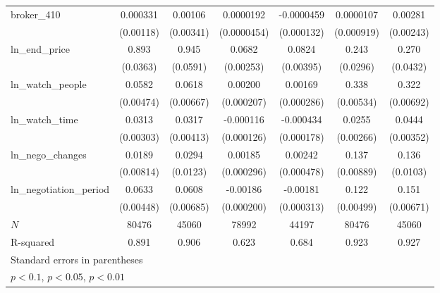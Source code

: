 {\begin{tabular}{l*{6}{c}}
broker\_410  &    0.000331         &     0.00106         &   0.0000192         &  -0.0000459         &   0.0000107         &     0.00281         \\
            &   (0.00118)         &   (0.00341)         & (0.0000454)         &  (0.000132)         &  (0.000919)         &   (0.00243)         \\
\addlinespace
ln\_end\_price&       0.893\sym{***}&       0.945\sym{***}&      0.0682\sym{***}&      0.0824\sym{***}&       0.243\sym{***}&       0.270\sym{***}\\
            &    (0.0363)         &    (0.0591)         &   (0.00253)         &   (0.00395)         &    (0.0296)         &    (0.0432)         \\
\addlinespace
ln\_watch\_people&      0.0582\sym{***}&      0.0618\sym{***}&     0.00200\sym{***}&     0.00169\sym{***}&       0.338\sym{***}&       0.322\sym{***}\\
            &   (0.00474)         &   (0.00667)         &  (0.000207)         &  (0.000286)         &   (0.00534)         &   (0.00692)         \\
\addlinespace
ln\_watch\_time&      0.0313\sym{***}&      0.0317\sym{***}&   -0.000116         &   -0.000434\sym{**} &      0.0255\sym{***}&      0.0444\sym{***}\\
            &   (0.00303)         &   (0.00413)         &  (0.000126)         &  (0.000178)         &   (0.00266)         &   (0.00352)         \\
\addlinespace
ln\_nego\_changes&      0.0189\sym{**} &      0.0294\sym{**} &     0.00185\sym{***}&     0.00242\sym{***}&       0.137\sym{***}&       0.136\sym{***}\\
            &   (0.00814)         &    (0.0123)         &  (0.000296)         &  (0.000478)         &   (0.00889)         &    (0.0103)         \\
\addlinespace
ln\_negotiation\_period&      0.0633\sym{***}&      0.0608\sym{***}&    -0.00186\sym{***}&    -0.00181\sym{***}&       0.122\sym{***}&       0.151\sym{***}\\
            &   (0.00448)         &   (0.00685)         &  (0.000200)         &  (0.000313)         &   (0.00499)         &   (0.00671)         \\
\midrule
\(N\)       &       80476         &       45060         &       78992         &       44197         &       80476         &       45060         \\
R-squared   &       0.891         &       0.906         &       0.623         &       0.684         &       0.923         &       0.927         \\
\bottomrule
\multicolumn{7}{l}{\footnotesize Standard errors in parentheses}\\
\multicolumn{7}{l}{\footnotesize \sym{*} \(p<0.1\), \sym{**} \(p<0.05\), \sym{***} \(p<0.01\)}\\
\end{tabular}
}
